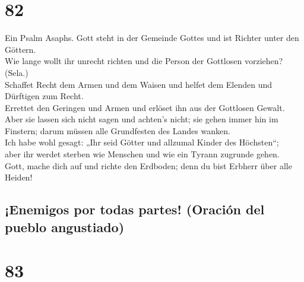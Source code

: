 \hypertarget{section-81}{%
\section{82}\label{section-81}}

 Ein Psalm Asaphs. Gott steht in der Gemeinde Gottes und
ist Richter unter den Göttern.\\
 Wie lange wollt ihr unrecht richten und die Person der
Gottlosen vorziehen? (Sela.)\\
 Schaffet Recht dem Armen und dem Waisen und helfet dem
Elenden und Dürftigen zum Recht.\\
 Errettet den Geringen und Armen und erlöset ihn aus der
Gottlosen Gewalt.\\
 Aber sie lassen sich nicht sagen und achten's nicht; sie
gehen immer hin im Finstern; darum müssen alle Grundfesten des Landes
wanken.\\
 Ich habe wohl gesagt: „Ihr seid Götter und allzumal
Kinder des Höchsten``;\\
 aber ihr werdet sterben wie Menschen und wie ein Tyrann
zugrunde gehen.\\
 Gott, mache dich auf und richte den Erdboden; denn du
bist Erbherr über alle Heiden!

\hypertarget{enemigos-por-todas-partes-oraciuxf3n-del-pueblo-angustiado}{%
\subsection{¡Enemigos por todas partes! (Oración del pueblo
angustiado)}\label{enemigos-por-todas-partes-oraciuxf3n-del-pueblo-angustiado}}

\hypertarget{section-82}{%
\section{83}\label{section-82}}

